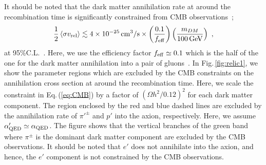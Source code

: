 \documentclass[aps,amsmath,preprint,epsf,superscriptaddress,nofootinbib,notitlepage]{revtex4-1}
\begin{document}
It should be noted that the dark matter annihilation rate at around the recombination time is significantly constrained from CMB 
observations~\cite{Adams:1998nr,Chen:2003gz,Slatyer:2009yq,Kanzaki:2009hf,Galli:2009zc,Kawasaki:2015peu,Slatyer:2015jla,Cline:2013fm,Liu:2016cnk,Bringmann:2016din};
\begin{eqnarray}
\label{eq:CMB}
\frac{1}{2}\left\langle {\sigma v_{\rm rel}} \right\rangle  \lesssim  4 \times 10^{-25} \, {\rm cm}^3/{\rm s}\times \left(\frac{0.1}{f_{\rm eff}}\right)
\left(\frac{m_{DM}}{100\,\rm GeV}\right)\ ,
\end{eqnarray}
at 95\%C.L.~\cite{Ade:2015xua}.
Here, we use the efficiency factor $f_{\rm eff} \simeq 0.1$ which is the half of the one for the dark matter annihilation
into a pair of gluons~\cite{Slatyer:2015jla}.
In Fig.\,\ref{fig:relic1}, we show the parameter regions which are excluded by the CMB constraints on the annihilation 
cross section at around the recombination time.
Here, we scale the constraint in Eq.\,(\ref{eq:CMB}) by a factor of $(\Omega h^2/0.12)^2$ for each dark matter component.
The region enclosed by the red and blue dashed lines are excluded by the annihilation rate of $\pi'^\pm$ 
and $p'$ into the axion, respectively.
Here, we assume $\alpha_{\rm QED}' \simeq \alpha_{\rm QED}$.
The figure shows that the vertical branches of the green band where $\pi^\pm$ is the dominant dark matter component 
are excluded by the CMB observations.
It should be noted that $e'$  does not annihilate into the axion, and hence, the $e'$ component is not 
constrained by the CMB observations.
\end{document}
